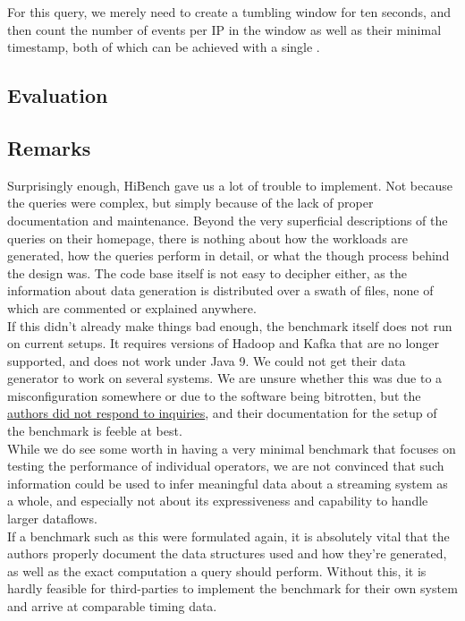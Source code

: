 For this query, we merely need to create a tumbling window for ten seconds, and then count the number of events per IP in the window as well as their minimal timestamp, both of which can be achieved with a single .

\subsection{Evaluation}

\subsection{Remarks}
Surprisingly enough, HiBench gave us a lot of trouble to implement. Not because the queries were complex, but simply because of the lack of proper documentation and maintenance. Beyond the very superficial descriptions of the queries on their homepage, there is nothing about how the workloads are generated, how the queries perform in detail, or what the though process behind the design was. The code base itself is not easy to decipher either, as the information about data generation is distributed over a swath of files, none of which are commented or explained anywhere. \\

If this didn't already make things bad enough, the benchmark itself does not run on current setups. It requires versions of Hadoop and Kafka that are no longer supported, and does not work under Java 9. We could not get their data generator to work on several systems. We are unsure whether this was due to a misconfiguration somewhere or due to the software being bitrotten, but the \href{https://github.com/intel-hadoop/HiBench/issues/535}{authors did not respond to inquiries}, and their documentation for the setup of the benchmark is feeble at best. \\

While we do see some worth in having a very minimal benchmark that focuses on testing the performance of individual operators, we are not convinced that such information could be used to infer meaningful data about a streaming system as a whole, and especially not about its expressiveness and capability to handle larger dataflows. \\

If a benchmark such as this were formulated again, it is absolutely vital that the authors properly document the data structures used and how they're generated, as well as the exact computation a query should perform. Without this, it is hardly feasible for third-parties to implement the benchmark for their own system and arrive at comparable timing data.

